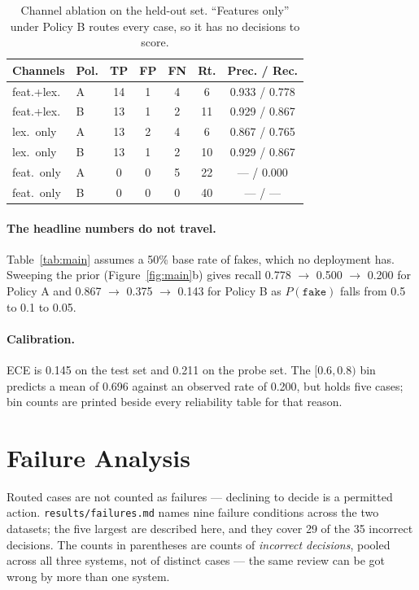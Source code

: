\documentclass{article}
\begin{document}
\begin{table}[t]
\centering
\small
\begin{tabular}{llccccc}
\toprule
Channels & Pol. & TP & FP & FN & Rt. & Prec. / Rec. \\
\midrule
feat.+lex. & A & 14 & 1 & 4 & 6  & 0.933 / 0.778 \\
feat.+lex. & B & 13 & 1 & 2 & 11 & 0.929 / 0.867 \\
lex.\ only & A & 13 & 2 & 4 & 6  & 0.867 / 0.765 \\
lex.\ only & B & 13 & 1 & 2 & 10 & 0.929 / 0.867 \\
feat.\ only & A & 0 & 0 & 5 & 22 & --- / 0.000 \\
feat.\ only & B & 0 & 0 & 0 & 40 & --- / --- \\
\bottomrule
\end{tabular}
\caption{Channel ablation on the held-out set. ``Features only'' under
Policy B routes every case, so it has no decisions to score.}
\label{tab:ablation}
\end{table}

\paragraph{The headline numbers do not travel.} Table~\ref{tab:main} assumes a
50\% base rate of fakes, which no deployment has. Sweeping the prior
(Figure~\ref{fig:main}b) gives recall 0.778 $\rightarrow$ 0.500 $\rightarrow$
0.200 for Policy A and 0.867 $\rightarrow$ 0.375 $\rightarrow$ 0.143 for
Policy B as $P(\texttt{fake})$ falls from 0.5 to 0.1 to 0.05.

\paragraph{Calibration.} ECE is 0.145 on the test set and 0.211 on the probe
set. The $[0.6,0.8)$ bin predicts a mean of 0.696 against an observed rate of
0.200, but holds five cases; bin counts are printed beside every reliability
table for that reason.

\section{Failure Analysis}

Routed cases are not counted as failures --- declining to decide is a permitted
action. \texttt{results/failures.md} names nine failure conditions across the
two datasets; the five largest are described here, and they cover 29 of the 35
incorrect decisions. The counts in parentheses are counts of \emph{incorrect
decisions}, pooled across all three systems, not of distinct cases --- the same
review can be got wrong by more than one system.
\end{document}
